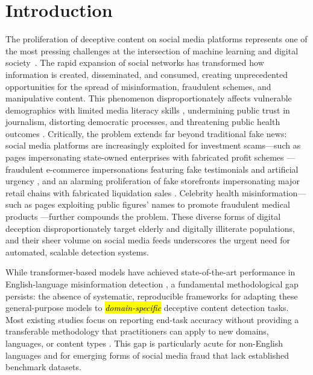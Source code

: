\documentclass[informatics,article,accept,pdftex,moreauthors]{Definitions/mdpi}
\begin{document}
\section{Introduction}
The proliferation of deceptive content on social media platforms represents one of the most pressing challenges at the intersection of machine learning and digital \mbox{society \citep{bondielli2019survey}}. The rapid expansion of social networks has transformed how information is created, disseminated, and consumed, creating unprecedented opportunities for the spread of misinformation, fraudulent schemes, and manipulative content.  This phenomenon disproportionately affects vulnerable demographics with limited media literacy skills \citep{higdon2022agree, higdon2025constructive}, undermining public trust in journalism, distorting democratic processes, and threatening public health outcomes \citep{tsfati2020causes, allcott2017social}. Critically, the problem extends far beyond traditional fake news: social media platforms are increasingly exploited for investment scams—such as pages impersonating state-owned enterprises with fabricated profit schemes \citep{scam2025investment}—fraudulent e-commerce impersonations featuring fake testimonials and artificial urgency \citep{scam2025cosmetics, scam2025ecommerce}, and an alarming proliferation of fake storefronts impersonating major retail chains with fabricated liquidation sales \citep{scam2026aurrera1, scam2026aurrera2, scam2026aurrera3, scam2026celulares}. Celebrity health misinformation—such as pages exploiting public figures' names to promote fraudulent medical products \citep{scam2025health}—further compounds the problem.  These diverse forms of digital deception disproportionately target elderly and digitally illiterate populations, and their sheer volume on social media feeds underscores the urgent need for automated, scalable detection systems.

While transformer-based models have achieved state-of-the-art performance in English-language misinformation detection \citep{kaliyar2021fakebert, singh2024comprehensive, rout2025reliable}, a fundamental methodological gap persists: the absence of systematic, reproducible frameworks for adapting these general-purpose models to \textit{\hl{domain-specific}%
} deceptive content detection tasks. Most existing studies focus on reporting end-task accuracy without providing a transferable methodology that practitioners can apply to new domains, languages, or content types \citep{alghamdi2024comprehensive}. This gap is particularly acute for non-English languages and for emerging forms of social media fraud that lack established benchmark datasets.
\end{document}
